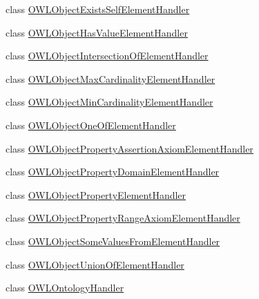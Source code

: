 \begin{DoxyCompactItemize}
\item 
class \hyperlink{classorg_1_1coode_1_1owlapi_1_1owlxmlparser_1_1_o_w_l_object_exists_self_element_handler}{O\-W\-L\-Object\-Exists\-Self\-Element\-Handler}
\item 
class \hyperlink{classorg_1_1coode_1_1owlapi_1_1owlxmlparser_1_1_o_w_l_object_has_value_element_handler}{O\-W\-L\-Object\-Has\-Value\-Element\-Handler}
\item 
class \hyperlink{classorg_1_1coode_1_1owlapi_1_1owlxmlparser_1_1_o_w_l_object_intersection_of_element_handler}{O\-W\-L\-Object\-Intersection\-Of\-Element\-Handler}
\item 
class \hyperlink{classorg_1_1coode_1_1owlapi_1_1owlxmlparser_1_1_o_w_l_object_max_cardinality_element_handler}{O\-W\-L\-Object\-Max\-Cardinality\-Element\-Handler}
\item 
class \hyperlink{classorg_1_1coode_1_1owlapi_1_1owlxmlparser_1_1_o_w_l_object_min_cardinality_element_handler}{O\-W\-L\-Object\-Min\-Cardinality\-Element\-Handler}
\item 
class \hyperlink{classorg_1_1coode_1_1owlapi_1_1owlxmlparser_1_1_o_w_l_object_one_of_element_handler}{O\-W\-L\-Object\-One\-Of\-Element\-Handler}
\item 
class \hyperlink{classorg_1_1coode_1_1owlapi_1_1owlxmlparser_1_1_o_w_l_object_property_assertion_axiom_element_handler}{O\-W\-L\-Object\-Property\-Assertion\-Axiom\-Element\-Handler}
\item 
class \hyperlink{classorg_1_1coode_1_1owlapi_1_1owlxmlparser_1_1_o_w_l_object_property_domain_element_handler}{O\-W\-L\-Object\-Property\-Domain\-Element\-Handler}
\item 
class \hyperlink{classorg_1_1coode_1_1owlapi_1_1owlxmlparser_1_1_o_w_l_object_property_element_handler}{O\-W\-L\-Object\-Property\-Element\-Handler}
\item 
class \hyperlink{classorg_1_1coode_1_1owlapi_1_1owlxmlparser_1_1_o_w_l_object_property_range_axiom_element_handler}{O\-W\-L\-Object\-Property\-Range\-Axiom\-Element\-Handler}
\item 
class \hyperlink{classorg_1_1coode_1_1owlapi_1_1owlxmlparser_1_1_o_w_l_object_some_values_from_element_handler}{O\-W\-L\-Object\-Some\-Values\-From\-Element\-Handler}
\item 
class \hyperlink{classorg_1_1coode_1_1owlapi_1_1owlxmlparser_1_1_o_w_l_object_union_of_element_handler}{O\-W\-L\-Object\-Union\-Of\-Element\-Handler}
\item 
class \hyperlink{classorg_1_1coode_1_1owlapi_1_1owlxmlparser_1_1_o_w_l_ontology_handler}{O\-W\-L\-Ontology\-Handler}

\end{DoxyCompactItemize}

